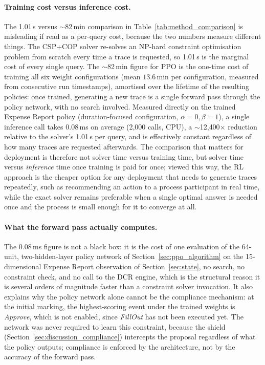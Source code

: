 \paragraph{Training cost versus inference cost.} The 1.01\,s versus $\sim$82\,min comparison in Table~\ref{tab:method_comparison} is misleading if read as a per-query cost, because the two numbers measure different things. The CSP+COP solver re-solves an NP-hard constraint optimisation problem from scratch every time a trace is requested, so 1.01\,s is the marginal cost of every single query. The $\sim$82\,min figure for \ac{PPO} is the one-time cost of training all six weight configurations (mean $13.6$\,min per configuration, measured from consecutive run timestamps), amortised over the lifetime of the resulting policies: once trained, generating a new trace is a single forward pass through the policy network, with no search involved. Measured directly on the trained Expense Report policy (duration-focused configuration, $\alpha{=}0,\beta{=}1$), a single inference call takes $0.08$\,ms on average (2{,}000 calls, CPU), a $\sim$12{,}400$\times$ reduction relative to the solver's 1.01\,s per query, and is effectively constant regardless of how many traces are requested afterwards. The comparison that matters for deployment is therefore not solver time versus training time, but solver time versus \emph{inference} time once training is paid for once; viewed this way, the \ac{RL} approach is the cheaper option for any deployment that needs to generate traces repeatedly, such as recommending an action to a process participant in real time, while the exact solver remains preferable when a single optimal answer is needed once and the process is small enough for it to converge at all.

\paragraph{What the forward pass actually computes.} The 0.08\,ms figure is not a black box: it is the cost of one evaluation of the 64-unit, two-hidden-layer policy network of Section~\ref{sec:ppo_algorithm} on the 15-dimensional Expense Report observation of Section~\ref{sec:state}, no search, no constraint check, and no call to the \ac{DCR} engine, which is the structural reason it is several orders of magnitude faster than a constraint solver invocation. It also explains why the policy network alone cannot be the compliance mechanism: at the initial marking, the highest-scoring event under the trained weights is \textit{Approve}, which is not enabled, since \textit{FillOut} has not been executed yet. The network was never required to learn this constraint, because the shield (Section~\ref{sec:discussion_compliance}) intercepts the proposal regardless of what the policy outputs; compliance is enforced by the architecture, not by the accuracy of the forward pass.

